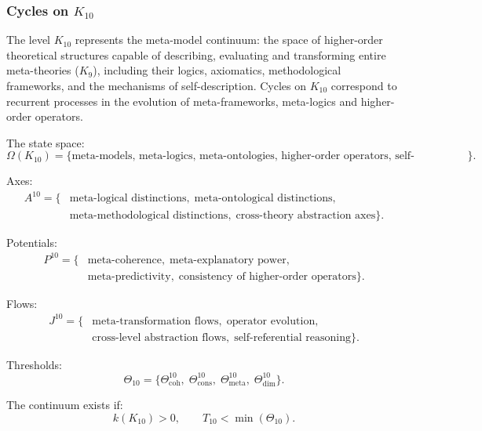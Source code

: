 
\subsubsection{Cycles on $K_{10}$}
\label{sec:cycles-k10}

The level $K_{10}$ represents the meta-model continuum: the space of
higher-order theoretical structures capable of describing, evaluating and
transforming entire meta-theories ($K_9$), including their logics,
axiomatics, methodological frameworks, and the mechanisms of
self-description. Cycles on $K_{10}$ correspond to recurrent processes in
the evolution of meta-frameworks, meta-logics and higher-order operators.

The state space:
\[
  \Omega(K_{10})
  = \{\text{meta-models, meta-logics, meta-ontologies, 
      higher-order operators, self-descriptions}\}.
\]

Axes:
\[
  \begin{aligned}
  A^{10}
  = \{&
    \text{meta-logical distinctions},\;
    \text{meta-ontological distinctions},\\
    &\text{meta-methodological distinctions},\;
    \text{cross-theory abstraction axes}
  \}.
  \end{aligned}
\]

Potentials:
\[
  \begin{aligned}
  P^{10}
   = \{&
      \text{meta-coherence},\;
      \text{meta-explanatory power},\\
      &\text{meta-predictivity},\;
      \text{consistency of higher-order operators}
    \}.
  \end{aligned}
\]

Flows:
\[
  \begin{aligned}
  J^{10}
   = \{&
       \text{meta-transformation flows},\;
       \text{operator evolution},\\
       &\text{cross-level abstraction flows},\;
       \text{self-referential reasoning}
     \}.
  \end{aligned}
\]

Thresholds:
\[
  \Theta_{10}
  = \{
       \Theta^{10}_\mathrm{coh},\;
       \Theta^{10}_\mathrm{cons},\;
       \Theta^{10}_\mathrm{meta},\;
       \Theta^{10}_\mathrm{dim}
    \}.
\]

The continuum exists if:
\[
  k(K_{10})>0,\qquad T_{10} < \min(\Theta_{10}).
\]



